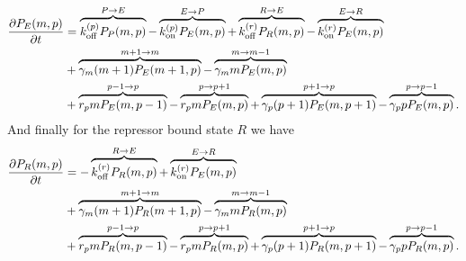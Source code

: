 \begin{equation}
  \begin{aligned}
    \dt{P_E(m, p)} &=
    \overbrace{\kpoff P_P(m, p)}^{P \rightarrow E} %
    - \overbrace{\kpon P_E(m, p)}^{E \rightarrow P} %
    + \overbrace{\kroff P_R(m, p)}^{R \rightarrow E} %
    - \overbrace{\kron P_E(m, p)}^{E \rightarrow R}\\ %
    &+ \overbrace{\gm (m + 1) P_E(m+1 , p)}^{m+1 \rightarrow m} %
    - \overbrace{\gm m P_E(m , p)}^{m \rightarrow m-1}\\ %
    &+ \overbrace{r_p m P_E(m, p - 1)}^{p-1 \rightarrow p} %
    - \overbrace{r_p m P_E(m, p)}^{p \rightarrow p+1} %
    + \overbrace{\gp (p + 1) P_E(m, p + 1)}^{p + 1 \rightarrow p} %
    - \overbrace{\gp p P_E(m, p)}^{p \rightarrow p-1}. %
  \end{aligned}
\end{equation}
And finally for the repressor bound state $R$ we have
\begin{equation}
  \begin{aligned}
    \dt{P_R(m, p)} &=
    - \overbrace{\kroff P_R(m, p)}^{R \rightarrow E} %
    + \overbrace{\kron P_E(m, p)}^{E \rightarrow R}\\ %
    &+ \overbrace{\gm (m + 1) P_R(m+1 , p)}^{m+1 \rightarrow m} %
    - \overbrace{\gm m P_R(m , p)}^{m \rightarrow m-1}\\ %
    &+ \overbrace{r_p m P_R(m, p - 1)}^{p-1 \rightarrow p} %
    - \overbrace{r_p m P_R(m, p)}^{p \rightarrow p+1} %
    + \overbrace{\gp (p + 1) P_R(m, p + 1)}^{p + 1 \rightarrow p} %
    - \overbrace{\gp p P_R(m, p)}^{p \rightarrow p-1}. %
  \end{aligned}
\end{equation}


